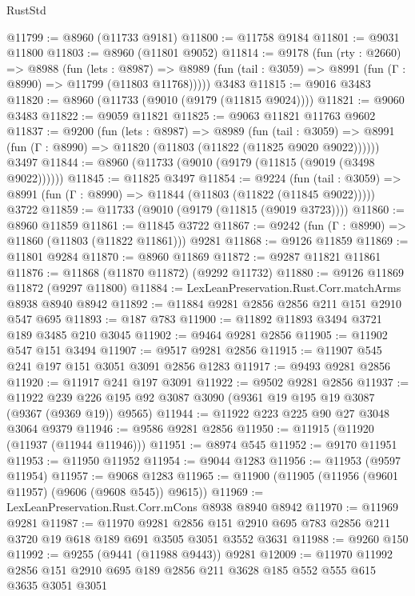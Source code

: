 \begin{lexlean}{RustStd}
\begin{coremodule}
@11799 := @8960 (@11733 @9181)
@11800 := @11758 @9184
@11801 := @9031 @11800
@11803 := @8960 (@11801 @9052)
@11814 := @9178
    (fun (rty : @2660) =>
    @8988
      (fun (lets : @8987) =>
      @8989 (fun (tail : @3059) => @8991 (fun (Γ : @8990) => @11799 (@11803 @11768)))))
    @3483
@11815 := @9016 @3483
@11820 := @8960 (@11733 (@9010 (@9179 (@11815 @9024))))
@11821 := @9060 @3483
@11822 := @9059 @11821
@11825 := @9063 @11821 @11763 @9602
@11837 := @9200
    (fun (lets : @8987) =>
    @8989
      (fun (tail : @3059) =>
      @8991 (fun (Γ : @8990) => @11820 (@11803 (@11822 (@11825 @9020 @9022))))))
    @3497
@11844 := @8960 (@11733 (@9010 (@9179 (@11815 (@9019 (@3498 @9022))))))
@11845 := @11825 @3497
@11854 := @9224
    (fun (tail : @3059) => @8991 (fun (Γ : @8990) => @11844 (@11803 (@11822 (@11845 @9022)))))
    @3722
@11859 := @11733 (@9010 (@9179 (@11815 (@9019 @3723))))
@11860 := @8960 @11859
@11861 := @11845 @3722
@11867 := @9242 (fun (Γ : @8990) => @11860 (@11803 (@11822 @11861))) @9281
@11868 := @9126 @11859
@11869 := @11801 @9284
@11870 := @8960 @11869
@11872 := @9287 @11821 @11861
@11876 := @11868 (@11870 @11872) (@9292 @11732)
@11880 := @9126 @11869 @11872 (@9297 @11800)
@11884 := LexLeanPreservation.Rust.Corr.matchArms @8938 @8940 @8942
@11892 := @11884 @9281 @2856 @2856 @211 @151 @2910 @547 @695
@11893 := @187 @783
@11900 := @11892 @11893 @3494 @3721 @189 @3485 @210 @3045
@11902 := @9464 @9281 @2856
@11905 := @11902 @547 @151 @3494
@11907 := @9517 @9281 @2856
@11915 := @11907 @545 @241 @197 @151 @3051 @3091 @2856 @1283
@11917 := @9493 @9281 @2856
@11920 := @11917 @241 @197 @3091
@11922 := @9502 @9281 @2856
@11937 := @11922 @239 @226 @195 @92 @3087 @3090 (@9361 @19 @195 @19 @3087 (@9367 (@9369 @19)) @9565)
@11944 := @11922 @223 @225 @90 @27 @3048 @3064 @9379
@11946 := @9586 @9281 @2856
@11950 := @11915 (@11920 (@11937 (@11944 @11946)))
@11951 := @8974 @545
@11952 := @9170 @11951
@11953 := @11950 @11952
@11954 := @9044 @1283
@11956 := @11953 (@9597 @11954)
@11957 := @9068 @1283
@11965 := @11900 (@11905 (@11956 (@9601 @11957) (@9606 (@9608 @545)) @9615))
@11969 := LexLeanPreservation.Rust.Corr.mCons @8938 @8940 @8942
@11970 := @11969 @9281
@11987 := @11970
    @9281
    @2856
    @151
    @2910
    @695
    @783
    @2856
    @211
    @3720
    @19
    @618
    @189
    @691
    @3505
    @3051
    @3552
    @3631
@11988 := @9260 @150
@11992 := @9255 (@9441 (@11988 @9443)) @9281
@12009 := @11970
    @11992
    @2856
    @151
    @2910
    @695
    @189
    @2856
    @211
    @3628
    @185
    @552
    @555
    @615
    @3635
    @3051
    @3051

\end{coremodule}
\end{lexlean}
